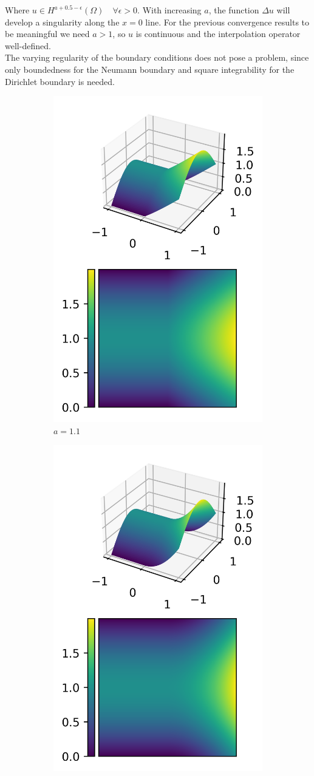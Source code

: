 \documentclass[11pt,a4paper]{article}
\begin{document}
Where $u \in H^{a+0.5 - \epsilon}(\Omega) \quad \forall \epsilon > 0$. With increasing $a$,
the function $\Delta u$ will develop a singularity along the $x = 0$ line. For the previous convergence
results to be meaningful we need $a > 1$, so $u$ is continuous and the interpolation operator
well-defined.\\
The varying regularity of the boundary conditions does not pose a problem, since only boundedness
for the Neumann boundary and square integrability for the Dirichlet boundary is needed.

\begin{figure}
  \centering
  \begin{subfigure}{.5\textwidth}
    \centering
    \includegraphics[width=.6\linewidth]{contour_nonsmooth_1}
    \caption{$a = 1.1$}
  \end{subfigure}%
  \begin{subfigure}{.5\textwidth}
    \centering
    \includegraphics[width=.6\linewidth]{contour_nonsmooth_2}

\end{subfigure}
\end{figure}
\end{document}
